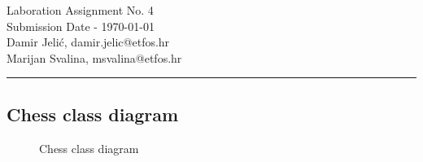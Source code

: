 \documentclass[11pt,a4paper]{article}
\begin{document}
\large
Laboration Assignment No. 4 \\
Submission Date - \yyyymmdddate \today \\
Damir Jelić, damir.jelic@etfos.hr \\
Marijan Svalina, msvalina@etfos.hr
\\
\rule{\linewidth}{0.1mm}

\setcounter{section}{4}
\subsection{Chess class diagram}
\begin{figure}[htb]
    \begin{center}
        \setlength\fboxsep{0pt}
        \caption{Chess class diagram}
        \label{fig:class_diag}
    \end{center}
\end{figure}
\end{document}
